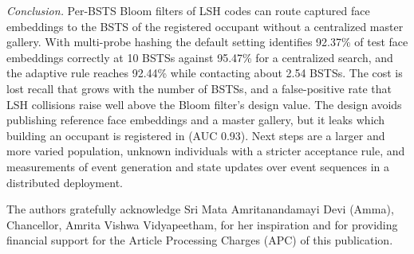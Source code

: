 \documentclass[pdflatex,sn-mathphys-num]{sn-jnl}%
\theoremstyle{thmstyleone}%
\theoremstyle{thmstyletwo}%
\theoremstyle{thmstylethree}%
\begin{document}
\emph{Conclusion.} Per-BSTS Bloom filters of LSH codes can route captured face embeddings to the BSTS of the registered occupant without a centralized master gallery. With multi-probe hashing the default setting identifies 92.37\% of test face embeddings correctly at 10 BSTSs against 95.47\% for a centralized search, and the adaptive rule reaches 92.44\% while contacting about 2.54 BSTSs. The cost is lost recall that grows with the number of BSTSs, and a false-positive rate that LSH collisions raise well above the Bloom filter's design value. The design avoids publishing reference face embeddings and a master gallery, but it leaks which building an occupant is registered in (AUC 0.93). Next steps are a larger and more varied population, unknown individuals with a stricter acceptance rule, and measurements of event generation and state updates over event sequences in a distributed deployment.

\backmatter


The authors gratefully acknowledge Sri Mata Amritanandamayi Devi (Amma), Chancellor, Amrita Vishwa Vidyapeetham, for her inspiration and for providing financial support for the Article Processing Charges (APC) of this publication.

\end{document}
